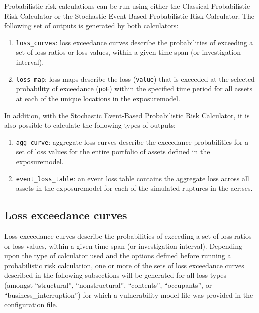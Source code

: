 Probabilistic risk calculations can be run using either the Classical
Probabilistic Risk Calculator or the Stochastic Event-Based Probabilistic Risk
Calculator. The following set of outputs is generated by both calculators:

\begin{enumerate}

  \item \Verb+loss_curves+: loss exceedance curves describe the probabilities
    of exceeding a set of loss ratios or loss values, within a given time span
    (or investigation interval).

  \item \Verb+loss_map+: loss maps describe the loss (\Verb+value+) 
    that is exceeded at the selected probability of exceedance (\Verb+poE+)
    within the specified time period for all \glspl{asset} at each of the unique
    locations in the \gls{exposuremodel}.

\end{enumerate}

In addition, with the Stochastic Event-Based Probabilistic Risk
Calculator, it is also possible to calculate the following types of outputs:

\begin{enumerate}

  \item \Verb+agg_curve+: aggregate loss curves describe the exceedance 
    probabilities for a set of loss values for the entire portfolio of 
    \glspl{asset} defined in the \gls{exposuremodel}.

  \item \Verb+event_loss_table+: an event loss table contains the aggregate 
    loss across all \glspl{asset} in the \gls{exposuremodel} for each of the
    simulated \glspl{rupture} in the \glsdesc{acr:ses}.

\end{enumerate}



\subsection{Loss exceedance curves}
\label{subsec:loss_curves}

Loss exceedance curves describe the probabilities of exceeding a set of loss
ratios or loss values, within a given time span (or investigation interval).
Depending upon the type of calculator used and the options defined before
running a probabilistic risk calculation, one or more of the sets of loss
exceedance curves described in the following subsections will be generated for
all loss types (amongst ``structural'', ``nonstructural'', ``contents'',
``occupants'', or ``business\_interruption'') for which a vulnerability model
file was provided in the configuration file.

